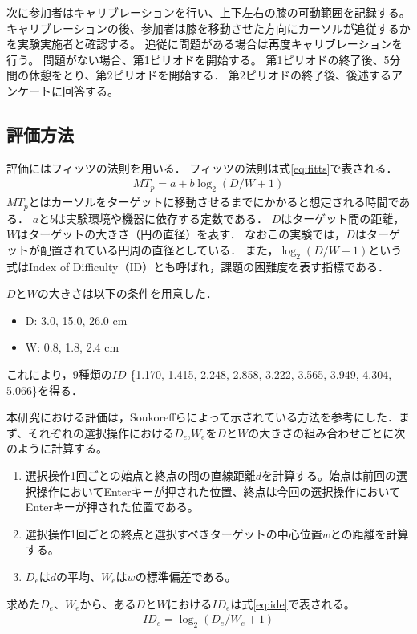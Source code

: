 \documentclass[submit, techrep]{ipsj}
\begin{document}
次に参加者はキャリブレーションを行い、上下左右の膝の可動範囲を記録する。
キャリブレーションの後、参加者は膝を移動させた方向にカーソルが追従するかを実験実施者と確認する。
追従に問題がある場合は再度キャリブレーションを行う。
問題がない場合、第1ピリオドを開始する。
第1ピリオドの終了後、5分間の休憩をとり、第2ピリオドを開始する．
第2ピリオドの終了後、後述するアンケートに回答する。



\subsection{評価方法}
評価にはフィッツの法則\cite{fitts}を用いる．
フィッツの法則は式\ref{eq:fitts}で表される．
\begin{eqnarray}
	MT_p = a + b\log_2{(D/W + 1)}
	\label{eq:fitts}
\end{eqnarray}
$MT_p$とはカーソルをターゲットに移動させるまでにかかると想定される時間である．
$a$と$b$は実験環境や機器に依存する定数である．
$D$はターゲット間の距離，$W$はターゲットの大きさ（円の直径）を表す．
なおこの実験では，$D$はターゲットが配置されている円周の直径としている．
また，$\log_2{(D/W + 1)}$という式はIndex of Difficulty（ID）とも呼ばれ，課題の困難度を表す指標である．\par
$D$と$W$の大きさは以下の条件を用意した．
\begin{itemize}
	\item {D: } 3.0, 15.0, 26.0 \si{cm}
	\item {W: } 0.8, 1.8, 2.4 \si{cm}
\end{itemize}
これにより，9種類の$ID$ \{1.170, 1.415, 2.248, 2.858, 3.222, 3.565, 3.949, 4.304, 5.066\}を得る．\par
本研究における評価は，Soukoreffら\cite{Soukoreff:2004:TSP:1056153.1056155}によって示されている方法を参考にした．まず、それぞれの選択操作における$D_e$,$W_e$を$D$と$W$の大きさの組み合わせごとに次のように計算する。
\begin{enumerate}
	\item 選択操作1回ごとの始点と終点の間の直線距離$d$を計算する。始点は前回の選択操作においてEnterキーが押された位置、終点は今回の選択操作においてEnterキーが押された位置である。
	\item 選択操作1回ごとの終点と選択すべきターゲットの中心位置$w$との距離を計算する。
	\item $D_e$は$d$の平均、$W_e$は$w$の標準偏差である。
\end{enumerate}
求めた$D_e$、$W_e$から、ある$D$と$W$における$ID_e$は式\ref{eq:ide}で表される。
\begin{eqnarray}
	ID_e = \log_2{(D_e/W_e + 1)}
	\label{eq:ide}
\end{eqnarray}
\end{document}
